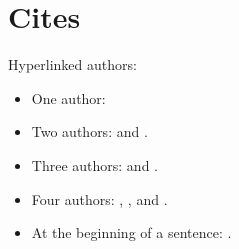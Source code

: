 \documentclass[english]{scrbook}
\begin{document}
\chapter{Cites}
Hyperlinked authors:

\begin{itemize}
  \item One author: \citeauthor{ABCD02} \cite{ABCD02}
  \item Two authors: \citeauthor{ABC01} \cite{ABC01} and \citeauthor{jabref} \cite{jabref}.
  \item Three authors: \citeauthor{AB00} \cite{AB00} and \citeauthor{vdAW2013} \cite{vdAW2013}.
  \item Four authors: \citeauthor{Ez10} \cite{Ez10}, \citeauthor{Go10} \cite{Go10}, and \citeauthor{latexcookbook} \cite{latexcookbook}.
  \item At the beginning of a sentence: .
\end{itemize}

\nocite{*}
\printbibliography
\end{document}
